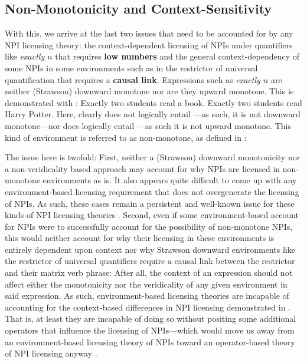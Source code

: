 \subsection{Non-Monotonicity and Context-Sensitivity}
With this, we arrive at the last two issues that need to be accounted for by any NPI licensing theory: the context-dependent licensing of NPIs under quantifiers like \textit{exactly $n$} that requires \textbf{low numbers} and the general context-dependency of some NPIs in some environments such as in the restrictor of universal quantification that requires a \textbf{causal link}. Expressions such as \textit{exactly $n$} are neither (Strawson) downward monotone nor are they upward monotone. This is demonstrated with :
\pex\label{ex:nm-exactly}
\a Exactly two students read a book.
\a Exactly two students read Harry Potter.
\xe
Here,  clearly does not logically entail ---as such, it is not downward monotone---nor does  logically entail ---as such it is not upward monotone. This kind of environment is referred to as non-monotone, as defined in :
\ex\label{def:nm}%

\xe
The issue here is twofold: First, neither a (Strawson) downward monotonicity nor a non-veridicality based approach may account for why NPIs are licensed in non-monotone environments as is. It also appears quite difficult to come up with any environment-based licensing requirement that does not overgenerate the licensing of NPIs. As such, these cases remain a persistent and well-known issue for these kinds of NPI licensing theories \parencite[see][p.~112, Footnote~1]{Gajewski2011}. Second, even if some environment-based account for NPIs were to successfully account for the possibility of non-monotone NPIs, this would neither account for why their licensing in these environments is entirely dependent upon context nor why Strawson downward environments like the restrictor of universal quantifiers require a causal link between the restrictor and their matrix verb phrase: After all, the context of an expression should not affect either the monotonicity nor the veridicality of any given environment in said expression. As such, environment-based licensing theories are incapable of accounting for the context-based differences in NPI licensing demonstrated in . That is, at least they are incapable of doing so without positing some additional operators that influence the licensing of NPIs---which would move us away from an environment-based licensing theory of NPIs toward an operator-based theory of NPI licensing anyway \parencite{Krifka1995,Chierchia2006,Chierchia2013,Crnic2011,Crnic2014-dogma,Crnic2014-nm}.

